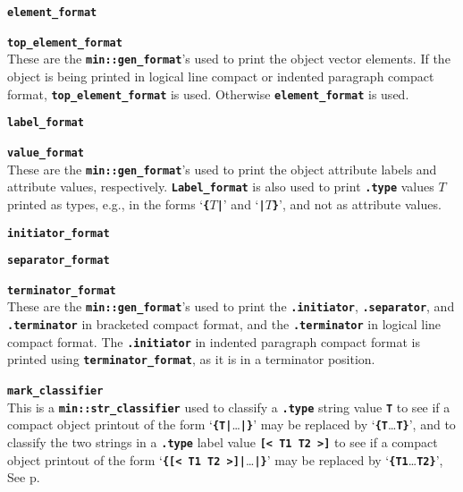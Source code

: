 \documentclass[12pt]{article}
\makeatletter
\newcommand{\TT}[1]{{\tt \bfseries #1}}
\newcommand{\ttmkey}[2]{\TT{#1}\index{#1@{\tt #1}!#2}}
\newcommand{\pagref}[1]{p\pageref{#1}}
\newcommand{\EOL}{\penalty \exhyphenpenalty}
\newenvironment{indpar}[1][0.3in]%
	{\begin{list}{}%
		     {\setlength{\itemsep}{0in}%
		      \setlength{\topsep}{0in}%
		      \setlength{\parsep}{1ex}%
		      \setlength{\labelwidth}{#1}%
		      \setlength{\leftmargin}{#1}%
		      \addtolength{\leftmargin}{\labelsep}}%
	 \item}%
	{\end{list}}
\newenvironment{itemlist}[1][1.2in]%
	{\begin{list}{}{\setlength{\labelwidth}{#1}%
		        \setlength{\leftmargin}{\labelwidth}%
		        \addtolength{\leftmargin}{+0.2in}%
		        \renewcommand{\makelabel}[1]{##1\hfill}}}%
	{\end{list}}
\makeatother
\begin{document}
\begin{itemlist}[0.2in]
\begin{indpar}[0.2in]
\begin{itemlist}[0.2in]
\end{itemlist}\end{indpar}

\item[\ttmkey{element\_format}{in {\tt min::obj\_format}}]
\item[\ttmkey{top\_element\_format}{in {\tt min::obj\_format}}]\vspace{-2ex}~\\
These are the \TT{min::gen\_format}'s used to print the
object vector elements.  If the object is being printed in
logical line compact or indented paragraph compact format,
\TT{top\_element\_format} is used.  Otherwise \TT{element\_format}
is used.

\item[\ttmkey{label\_format}{in {\tt min::obj\_format}}]
\item[\ttmkey{value\_format}{in {\tt min::obj\_format}}]\vspace{-2ex}~\\
These are the \TT{min::gen\_format}'s used to print the
object attribute labels and attribute values, respectively.
\TT{Label\_\EOL format} is also used to print \TT{.type} values $T$
printed as types, e.g., in the forms `\TT{\{$T$|}' and `\TT{|$T$\}}',
and not as attribute values.

\item[\ttmkey{initiator\_format}{in {\tt min::obj\_format}}]
\item[\ttmkey{separator\_format}{in {\tt min::obj\_format}}]\vspace{-2ex}
\item[\ttmkey{terminator\_format}{in {\tt min::obj\_format}}]\vspace{-2ex}~\\
These are the \TT{min::gen\_format}'s used to print the
\TT{.initiator}, \TT{.separator}, and \TT{.terminator} in bracketed compact
format, and the \TT{.terminator} in logical line compact format.
The \TT{.initiator} in indented paragraph compact format is
printed using \TT{terminator\_format}, as it is in a terminator
position.

\item[\ttmkey{mark\_classifier}{in {\tt min::obj\_format}}]~\\
\label{MARK_CLASSIFIER}
This is a \TT{min::str\_classifier} used to classify
a \TT{.type} string value \TT{T} to see if
a compact object printout of the
form `\TT{\{T|}\ldots\TT{|\}}' may be replaced by `\TT{\{T}\ldots\TT{T\}}',
and to classify the two strings in a \TT{.type} label value \TT{[< T1 T2 >]}
to see if a compact object printout of the
form `\TT{\{[< T1 T2 >]|}\ldots\TT{|\}}' may be replaced by
`\TT{\{T1}\ldots\TT{T2\}}',
See \pagref{MARK_CLASSIFIER_USAGE}.


\end{itemlist}
\end{document}
